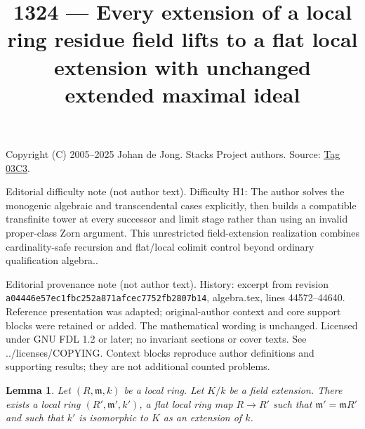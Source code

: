\documentclass{amsart}
\theoremstyle{plain}
\newtheorem{lemma}[subsection]{Lemma}
\theoremstyle{definition}
\theoremstyle{remark}
\numberwithin{equation}{subsection}
\begin{document}
\title[Stacks Project, Tag 03C3]{1324 --- Every extension of a local ring residue field lifts to a flat local extension with unchanged extended maximal ideal}
\maketitle
\noindent Copyright (C) 2005--2025 Johan de Jong. Stacks Project authors. Source: \href{https://stacks.math.columbia.edu/tag/03C3}{Tag 03C3}.

\noindent Editorial difficulty note (not author text). Difficulty H1: The author solves the monogenic algebraic and transcendental cases explicitly, then builds a compatible transfinite tower at every successor and limit stage rather than using an invalid proper-class Zorn argument. This unrestricted field-extension realization combines cardinality-safe recursion and flat/local colimit control beyond ordinary qualification algebra..

\noindent Editorial provenance note (not author text). History: excerpt from revision \texttt{a0444\allowbreak 6e57e\allowbreak c1fbc\allowbreak 252a8\allowbreak 71afc\allowbreak ec775\allowbreak 2fb28\allowbreak 07b14}, algebra.tex, lines 44572--44640. Reference presentation was adapted; original-author context and core support blocks were retained or added. The mathematical wording is unchanged. Licensed under GNU FDL 1.2 or later; no invariant sections or cover texts. See ../licenses/COPYING. Context blocks reproduce author definitions and supporting results; they are not additional counted problems.

\begin{lemma}
\label{lemma-flat-local-given-residue-field}
Let $(R, \mathfrak m, k)$ be a local ring. Let $K/k$ be a field
extension. There exists a local ring $(R', \mathfrak m', k')$, a flat local
ring map $R \to R'$ such that $\mathfrak m' = \mathfrak mR'$ and such that
$k'$ is isomorphic to $K$ as an extension of $k$.
\end{lemma}
\end{document}
